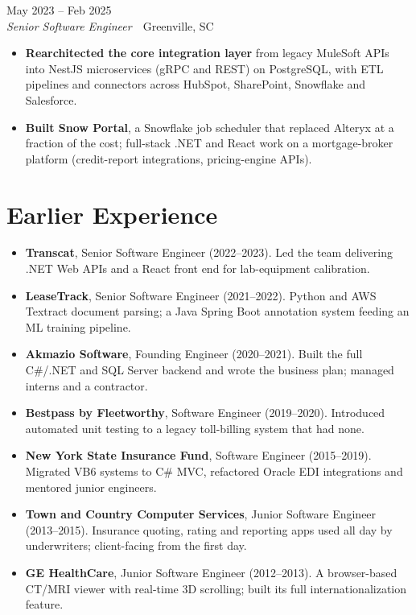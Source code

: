 \documentclass[10pt,letterpaper]{article}
\newcommand{\szmeta}{\fontsize{8pt}{10pt}\selectfont}
\begin{document}
\vspace{3pt}
 \hfill {\color{muted}\szmeta May 2023 – Feb 2025}\\[1pt]
{\itshape Senior Software Engineer}{\color{muted}\ \textbullet\ Greenville, SC}
\vspace{2pt}
\begin{itemize}
\item \textbf{Rearchitected the core integration layer} from legacy MuleSoft APIs into NestJS microservices (gRPC and REST) on PostgreSQL, with ETL pipelines and connectors across HubSpot, SharePoint, Snowflake and Salesforce.
\item \textbf{Built Snow Portal}, a Snowflake job scheduler that replaced Alteryx at a fraction of the cost; full-stack .NET and React work on a mortgage-broker platform (credit-report integrations, pricing-engine APIs).
\end{itemize}
\section*{Earlier Experience}
\begingroup\szmeta\begin{itemize}[leftmargin=11pt,labelsep=5pt,topsep=1pt,partopsep=0pt,parsep=0pt,itemsep=1pt]
\item \textbf{Transcat}, Senior Software Engineer {\color{muted}(2022--2023)}. Led the team delivering .NET Web APIs and a React front end for lab-equipment calibration.
\item \textbf{LeaseTrack}, Senior Software Engineer {\color{muted}(2021--2022)}. Python and AWS Textract document parsing; a Java Spring Boot annotation system feeding an ML training pipeline.
\item \textbf{Akmazio Software}, Founding Engineer {\color{muted}(2020--2021)}. Built the full C\#/.NET and SQL Server backend and wrote the business plan; managed interns and a contractor.
\item \textbf{Bestpass by Fleetworthy}, Software Engineer {\color{muted}(2019--2020)}. Introduced automated unit testing to a legacy toll-billing system that had none.
\item \textbf{New York State Insurance Fund}, Software Engineer {\color{muted}(2015--2019)}. Migrated VB6 systems to C\# MVC, refactored Oracle EDI integrations and mentored junior engineers.
\item \textbf{Town and Country Computer Services}, Junior Software Engineer {\color{muted}(2013--2015)}. Insurance quoting, rating and reporting apps used all day by underwriters; client-facing from the first day.
\item \textbf{GE HealthCare}, Junior Software Engineer {\color{muted}(2012--2013)}. A browser-based CT/MRI viewer with real-time 3D scrolling; built its full internationalization feature.
\end{itemize}\endgroup
\end{document}
